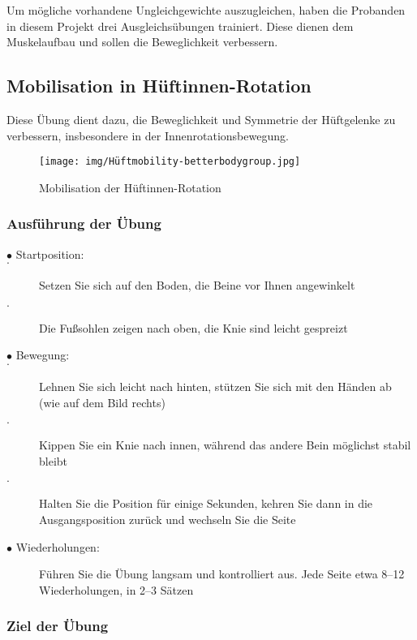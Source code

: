 Um mögliche vorhandene Ungleichgewichte auszugleichen, haben die Probanden in diesem Projekt drei Ausgleichsübungen trainiert. Diese dienen dem Muskelaufbau und sollen die Beweglichkeit verbessern.

\subsection{Mobilisation in Hüftinnen-Rotation}
Diese Übung dient dazu, die Beweglichkeit und Symmetrie der Hüftgelenke zu verbessern, insbesondere in der Innenrotationsbewegung.
\begin{figure}[h!]
    \centering
    \texttt{[image: img/Hüftmobility-betterbodygroup.jpg]}
    \caption{Mobilisation der Hüftinnen-Rotation \cite{betterbodygroup.co.uk}}
    \label{Mobilisation der Hüftinnen-Rotation}
\end{figure}

\subsubsection{Ausführung der Übung}

\begin{description}
    \item[$\bullet$ Startposition:]
        \item[$\cdot$ ] Setzen Sie sich auf den Boden, die Beine vor Ihnen angewinkelt
        \item[$\cdot$] Die Fußsohlen zeigen nach oben, die Knie sind leicht gespreizt
    \item[$\bullet$ Bewegung:]
        \item[$\cdot$] Lehnen Sie sich leicht nach hinten, stützen Sie sich mit den Händen ab (wie auf dem Bild rechts)
        \item[$\cdot$]Kippen Sie ein Knie nach innen, während das andere Bein möglichst stabil bleibt
        \item[$\cdot$] Halten Sie die Position für einige Sekunden, kehren Sie dann in die Ausgangsposition zurück und wechseln Sie die Seite
    \item[$\bullet$ Wiederholungen:]Führen Sie die Übung langsam und kontrolliert aus. Jede Seite etwa 8–12 Wiederholungen, in 2–3 Sätzen
\end{description}

\subsubsection{Ziel der Übung}

